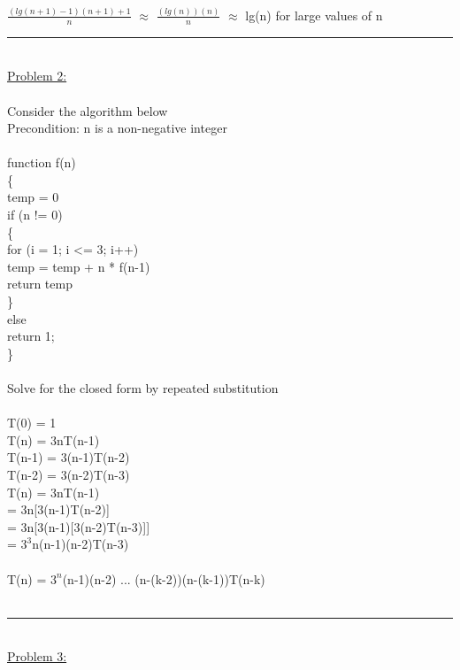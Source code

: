 \documentclass{article}
\begin{document}
    \\
    \indent $\frac{(lg(n+1)-1)(n+1)+1}{n}$ $\approx$ $\frac{(lg(n))(n)}{n}$ $\approx$ lg(n) for large values of n\\
    \rule{\textwidth}{0.5pt}\\
    \underline{Problem 2:}\\\\
    Consider the algorithm below\\Precondition: n is a non-negative integer\\
    \\
    function f(n)\\
    \{\\
    \indent temp = 0\\
    \indent if (n != 0)\\
    \indent \{\\
    \indent \indent for (i = 1; i <= 3; i++)\\
    \indent \indent \indent temp = temp + n * f(n-1)\\
    \indent \indent return temp\\
    \indent \}\\
    \indent else\\
    \indent \indent return 1;\\
    \}\\
    \\
    Solve for the closed form by repeated substitution\\
    \\
    \indent T(0) = 1\\
    \indent T(n) = 3nT(n-1)\\
    \indent T(n-1) = 3(n-1)T(n-2)\\
    \indent T(n-2) = 3(n-2)T(n-3)\\
    \indent T(n) = 3nT(n-1)\\
    \indent\hspace{0.73cm} = 3n[3(n-1)T(n-2)]\\
    \indent\hspace{0.73cm} = 3n[3(n-1)[3(n-2)T(n-3)]]\\
    \indent\hspace{0.73cm} = $3^3$n(n-1)(n-2)T(n-3)\\
    \\
    \indent T(n) = $3^n$(n-1)(n-2) ... (n-(k-2))(n-(k-1))T(n-k)\\
    \\
    \rule{\textwidth}{0.5pt}\\
    \underline{Problem 3:}\\\\
\end{document}
